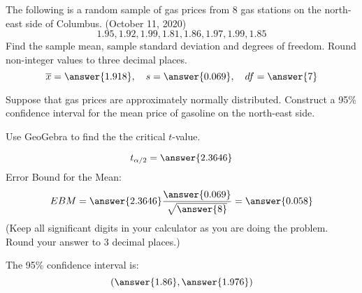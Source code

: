 \documentclass{ximera}
\begin{document}
 \begin{problem}\label{prob:140hom7prob2}
 The following is a random sample of gas prices from 8 gas stations on the north-east side of Columbus. (October 11, 2020)
 $$1.95, 1.92, 1.99, 1.81, 1.86, 1.97, 1.99, 1.85$$
 Find the sample mean, sample standard deviation and degrees of freedom.  Round non-integer values to three decimal places.
 $$\overline{x}=\answer{1.918},\quad s=\answer{0.069},\quad df=\answer{7}$$
 
 Suppose that gas prices are approximately normally distributed.  Construct a 95\% confidence interval for the mean price of gasoline on the north-east side.
 
 Use GeoGebra to find the the critical $t$-value. 
 \begin{center}  
\end{center}
$$t_{\alpha/2}=\answer{2.3646}$$
Error Bound for the Mean:
$$EBM=\answer{2.3646}\frac{\answer{0.069}}{\sqrt{\answer{8}}}=\answer{0.058}$$
(Keep all significant digits in your calculator as you are doing the problem.  Round your answer to 3 decimal places.)

The 95\% confidence interval is:
$$(\answer{1.86},\answer{1.976})$$
\end{problem}
\end{document}

